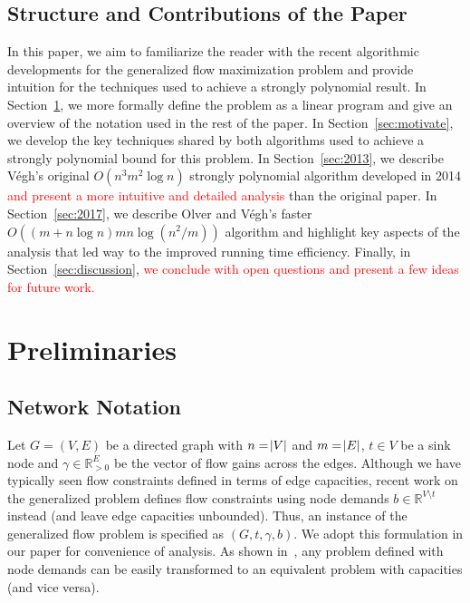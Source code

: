 \documentclass[11pt]{article}
\theoremstyle{definition}
\theoremstyle{definition}
\theoremstyle{definition}
\newcommand{\R}{\mathbb{R}}
\newcommand{\rewrite}[1]{\textcolor{red}{#1}}
\begin{document}
	\subsection{Structure and Contributions of the Paper}\label{sec:structure}
	In this paper, we aim to
	familiarize the reader with the recent algorithmic developments for the
	generalized flow maximization problem and provide intuition for the techniques
	used to achieve a strongly polynomial result. In Section~\ref{sec:prelim}, we more formally
	define the problem as a linear program and give an overview of the notation
	used in the rest of the paper. In Section~\ref{sec:motivate}, we develop the key techniques
	shared by both algorithms used to achieve a strongly polynomial bound for this
	problem. In Section~\ref{sec:2013}, we describe Végh's original $O(n^3m^2 \log n)$ strongly
	polynomial algorithm developed in 2014 \rewrite{and present a more intuitive and
	detailed analysis} than the original paper. In Section~\ref{sec:2017}, we describe Olver and
	Végh's faster $O((m + n\log n)mn\log(n^2 / m))$ algorithm and highlight key
	aspects of the analysis that led way to the improved running time efficiency.
	Finally, in Section~\ref{sec:discussion}, 
    \rewrite{we conclude with open questions and present a few ideas
	for future work.}
    
\section{Preliminaries}\label{sec:prelim}

	\subsection{Network Notation}\label{sec:notation}
	Let $G=(V,E)$ be a directed graph with $n=\abs{V}$ and $m=\abs{E}$,
	$t \in V$ be a sink node and $\gamma \in \R_{>0}^E$ be the vector of flow gains
	across the edges. Although we have typically seen flow constraints defined in terms of
	edge capacities, recent work on the generalized problem defines flow
	constraints using node demands $b \in \R^{V \setminus t}$ instead (and leave
	edge capacities unbounded). Thus, an instance of the generalized flow problem
	is specified as $(G, t, \gamma, b)$.
	We adopt this formulation in our paper for
	convenience of analysis. As shown in~\cite{Vegh2013}, any problem defined with
	node demands can be easily transformed to an equivalent problem with
	capacities (and vice versa). 
\end{document}
